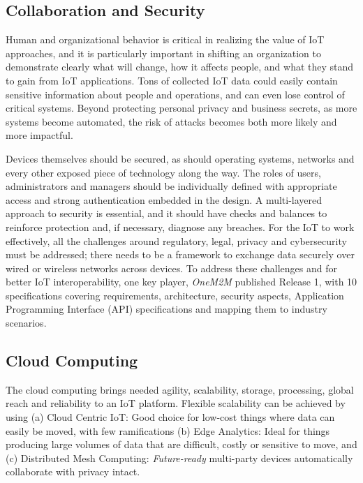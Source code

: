 \documentclass[sigconf]{acmart}
\begin{document}
		
	\subsection{Collaboration and Security}
	Human and organizational behavior is critical in realizing the value of IoT approaches, and it is particularly important in shifting an organization to demonstrate clearly what will change, how it affects people, and what they stand to gain from IoT applications. Tons of collected IoT data could easily contain sensitive information about people and operations, and can even lose control of critical systems. Beyond protecting personal privacy and business secrets, as more systems become automated, the risk of attacks becomes both more likely and more impactful. 
	
	Devices themselves should be secured, as should operating systems, networks and every other exposed piece of technology along the way. The roles of users, administrators and managers should be individually defined with appropriate access and strong authentication embedded in the design. A multi-layered approach to security is essential, and it should have checks and balances to reinforce protection and, if necessary, diagnose any breaches. For the IoT to work effectively, all the challenges around regulatory, legal, privacy and cybersecurity must be addressed; there needs to be a framework to exchange data securely over wired or wireless networks across devices. To address these challenges and for better IoT interoperability, one key player, {\em OneM2M} published Release 1, with 10 specifications covering requirements, architecture, security aspects, Application Programming Interface (API) specifications and mapping them to industry scenarios\cite{one-m2m}.
	
	\subsection{Cloud Computing}
	The cloud computing brings needed agility, scalability, storage, processing, global reach and reliability to an IoT platform. Flexible scalability can be achieved by using (a) Cloud Centric IoT: Good choice for low-cost things where data can easily be moved, with few ramifications (b) Edge Analytics: Ideal for things producing large volumes of data that are difficult, costly or sensitive to move, and (c) Distributed Mesh Computing: {\em Future-ready} multi-party devices automatically collaborate with privacy intact\cite{hp}. 
	
\end{document}

